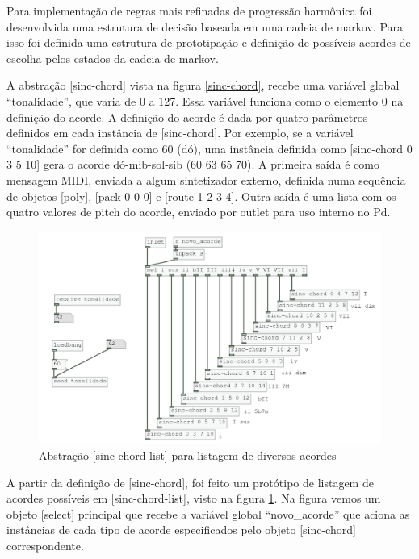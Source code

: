 \documentclass[draft]{ppgmus}
\begin{document}
Para implementação de regras mais refinadas de progressão harmônica foi desenvolvida uma
estrutura de decisão baseada em uma cadeia de markov. Para isso foi definida uma
estrutura de prototipação e definição de possíveis acordes de escolha pelos estados
da cadeia de markov.

A abstração [sinc-chord] vista na figura \ref{sinc-chord}, recebe uma variável global
``tonalidade'',  que varia de 0 a 127. Essa variável funciona como o elemento 0 na definição
do acorde. A definição do acorde é dada por quatro parâmetros definidos em cada instância
de [sinc-chord]. Por exemplo, se a variável ``tonalidade'' for definida como 60 (dó), uma instância 
definida como [sinc-chord 0 3 5 10] gera o acorde dó-mib-sol-sib (60 63 65 70).
A primeira saída é como mensagem MIDI, enviada a algum sintetizador externo, definida numa sequência
de objetos [poly], [pack 0 0 0] e [route 1 2 3 4]. Outra saída é uma lista com os quatro valores
de pitch do acorde, enviado por outlet para uso interno no Pd.


\begin{figure}
\includegraphics[scale=.7]{sinc-chord-list}
\caption{Abstração [sinc-chord-list] para listagem de diversos acordes}
\label{sinc-chord-list}
\end{figure}


A partir da definição de [sinc-chord], foi feito um protótipo de listagem de acordes
possíveis em [sinc-chord-list], visto na figura \ref{sinc-chord-list}. Na figura vemos
um objeto [select] principal que recebe a variável global ``novo\_acorde'' que aciona as instâncias
de cada tipo de acorde especificados pelo objeto [sinc-chord] correspondente.
\end{document}
